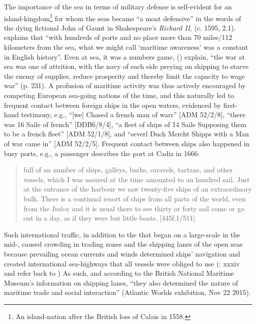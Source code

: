The importance of the sea in terms of military defense is self-evident for an island-kingdom\footnote{An island-nation after the British loss of Calais in 1558.} for whom the seas became “a moat defensive” in the words of the dying fictional John of Gaunt in Shakespeare’s \textit{Richard II,} (c. 1595, 2.1). \citet[24]{Bicheno2012} explains that “with hundreds of ports and no place more than 70 miles/112 kilometers from the sea, what we might call ‘maritime awareness’ was a constant in English history”. Even at sea, it was a numbers game, (\citealt{AdkinsAdkins2008}) explain, “the war at sea was one of attrition, with the navy of each side preying on  shipping to starve the enemy of supplies, reduce prosperity and thereby limit the capacity to wage war” (p. 231). A profusion of maritime activity was thus actively encouraged by competing European sea-going nations of the time, and this naturally led to frequent contact between foreign ships in the open waters, evidenced by first-hand testimony, e.g., “[we] Chased a french man of warr” [ADM 52/2/8], “there was 16 Saile of french” [DDB6/8/4], “a fleet of ships of 14 Saile Supposing them to be a french fleet” [ADM 52/1/8], and “severl Duch Mercht Shipps with a Man of war came in” [ADM 52/2/5]. Frequent contact between ships also happened in busy ports, e.g., a passenger describes the port at Cadiz in 1666:

\begin{quotation}
full of an  number of ships, galleys, barks, caravels, tartans, and other vessels, which I was assured at the time amounted to an hundred sail. Just at the entrance of the harbour we saw twenty-five ships of an extraordinary bulk. There is a continual resort of ships from all parts of the world, even from the \textit{Indes}; and it is usual there to see thirty or forty sail come or go out in a day, as if they were but little boats. [445f.1/511] 
\end{quotation}

Such international traffic, in addition to the   that began on a large-scale in the mid-, caused crowding in trading zones and the shipping lanes of the open seas because prevailing ocean currents and winds determined ships’ navigation and created international sea-highways that all vessels were obliged to use (\citealt{AdkinsAdkins2008}: xxxiv and refer back to ) As such, and according to the British National Maritime Museum’s information on shipping lanes, “they also determined the nature of maritime trade and social interaction” (Atlantic Worlds exhibition, Nov 22 2015).  

